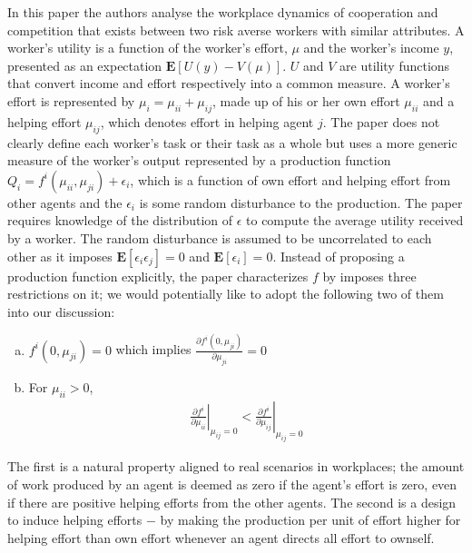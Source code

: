 \documentclass[a4paper,10pt]{article}
\theoremstyle{definition}
\begin{document}
In this paper the authors analyse the workplace dynamics of cooperation and competition that exists between two risk averse workers with similar attributes. A worker's utility is a function of the worker's effort, $\mu$ and the worker's income $y$, presented as an expectation $\mathbf{E}[U(y)-V(\mu)]$.
$U$ and $V$ are utility functions that convert income and effort respectively into a common measure. A worker's effort is represented by $\mu_i = \mu_{ii}+\mu_{ij}$, made up of his or her own effort $\mu_{ii}$ and a helping effort $\mu_{ij}$, which denotes effort in helping agent $j$. The paper does not clearly define each worker's task or their task as a whole but uses a more generic measure of the worker's output represented by a production function $Q_i=f^i(\mu_{ii},\mu_{ji})+\epsilon_i$,
which is a function of own effort and helping effort from other agents and the $\epsilon_i$ is some random disturbance to the production. The paper requires knowledge of the distribution of $\epsilon$ to compute the average utility received by a worker. The random disturbance is assumed to be uncorrelated to each other as it imposes $\mathbf{E}[\epsilon_i\epsilon_j]=0$ and $\mathbf{E}[\epsilon_i]=0$. Instead of proposing a production function explicitly, the paper characterizes $f$ by imposes three restrictions on it; we would potentially like to adopt the following two of them into our discussion: 



\begin{enumerate}[(a)]
\item $f^i(0,\mu_{ji})=0$ which implies $\frac{\partial f^i(0,\mu_{ji})}{\partial \mu_{ji}}=0$
\item For $\mu_{ii}>0$,
\begin{align*}
\left.\frac{\partial f^i}{\partial \mu_{ii}}\right|_{\mu_{ij}=0} < \left.\frac{\partial f^i}{\partial \mu_{ij}}\right|_{\mu_{ij}=0}
\end{align*}
\end{enumerate}
The first is a natural property aligned to real scenarios in workplaces; the amount of work produced by an agent is deemed as zero if the agent's effort is zero, even if there are positive helping efforts from the other agents. The second is a design to induce helping efforts $-$ by making the production per unit of effort higher for helping effort than own effort whenever an agent directs all effort to ownself.
\end{document}
